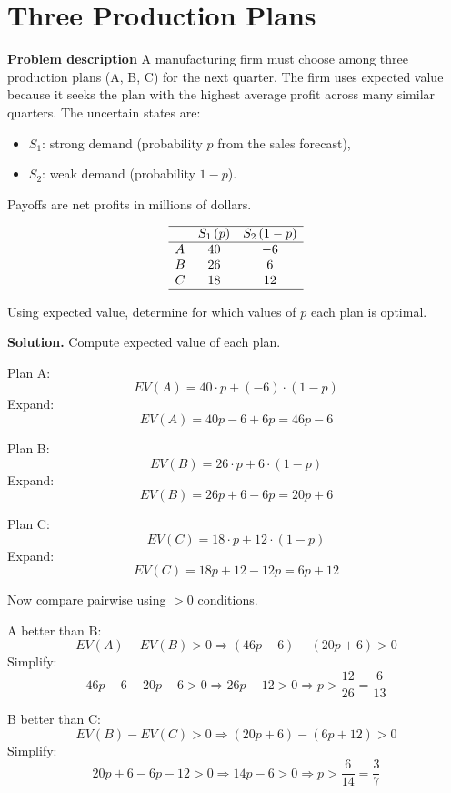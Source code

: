 \begin{ExamProblems}
		
		\hypertarget{c7-ex4}{}
		\item
		\section{Three Production Plans}
		
		\textbf{Problem description}
		A manufacturing firm must choose among three production plans (A, B, C) for the next quarter. The firm uses expected value because it seeks the plan with the highest average profit across many similar quarters. The uncertain states are:
		\begin{itemize}
			\item \(S_1\): strong demand (probability \(p\) from the sales forecast),
			\item \(S_2\): weak demand (probability \(1-p\)).
		\end{itemize}
		Payoffs are net profits in millions of dollars.
		
		\[
		\begin{array}{lcc}
			\hline
			& S_1\,(p) & S_2\,(1-p) \\
			\hline
			A & 40 & -6 \\
			B & 26 & 6 \\
			C & 18 & 12 \\
			\hline
		\end{array}
		\]
		
		Using expected value, determine for which values of \(p\) each plan is optimal.
		
		\textbf{Solution.}
		Compute expected value of each plan.
		
		Plan A:
		\[
		EV(A)=40\cdot p + (-6)\cdot(1-p)
		\]
		Expand:
		\[
		EV(A)=40p - 6 + 6p = 46p - 6
		\]
		
		Plan B:
		\[
		EV(B)=26\cdot p + 6\cdot(1-p)
		\]
		Expand:
		\[
		EV(B)=26p + 6 - 6p = 20p+6
		\]
		
		Plan C:
		\[
		EV(C)=18\cdot p + 12\cdot(1-p)
		\]
		Expand:
		\[
		EV(C)=18p + 12 - 12p = 6p+12
		\]
		
		Now compare pairwise using \(>0\) conditions.
		
		A better than B:
		\[
		EV(A)-EV(B)>0 \Rightarrow (46p-6)-(20p+6)>0
		\]
		Simplify:
		\[
		46p-6-20p-6>0 \Rightarrow 26p-12>0 \Rightarrow p>\frac{12}{26}=\frac{6}{13}
		\]
		
		B better than C:
		\[
		EV(B)-EV(C)>0 \Rightarrow (20p+6)-(6p+12)>0
		\]
		Simplify:
		\[
		20p+6-6p-12>0 \Rightarrow 14p-6>0 \Rightarrow p>\frac{6}{14}=\frac{3}{7}
		\]
		

\end{ExamProblems}
